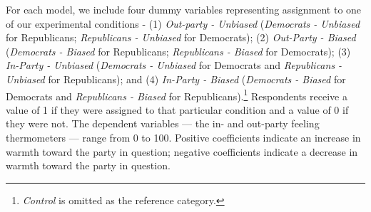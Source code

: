 \documentclass[12pt, letterpaper]{article}
\begin{document}
For each model, we include four dummy variables representing assignment to one of our experimental conditions - (1) \textit{Out-party - Unbiased} (\textit{Democrats - Unbiased} for Republicans; \textit{Republicans - Unbiased} for Democrats); (2) \textit{Out-Party - Biased} (\textit{Democrats - Biased} for Republicans; \textit{Republicans - Biased} for Democrats); (3) \textit{In-Party - Unbiased} (\textit{Democrats - Unbiased} for Democrats and \textit{Republicans - Unbiased} for Republicans); and (4) \textit{In-Party - Biased} (\textit{Democrats - Biased} for Democrats and \textit{Republicans - Biased} for Republicans).\footnote{\textit{Control} is omitted as the reference category.} Respondents receive a value of 1 if they were assigned to that particular condition and a value of 0 if they were not. The dependent variables --- the in- and out-party feeling thermometers --- range from 0 to 100. Positive coefficients indicate an increase in warmth toward the party in question; negative coefficients indicate a decrease in warmth toward the party in question.
\end{document}

